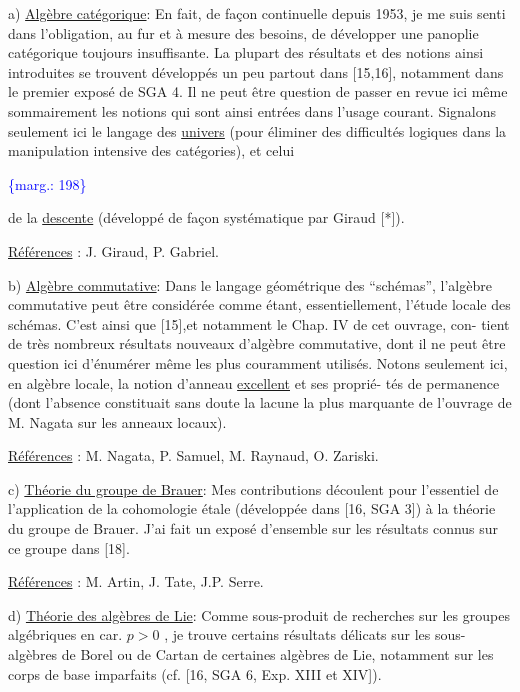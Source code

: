 \documentclass[11pt]{article}
\newcommand{\scanpage}[1]{\par\bigskip\noindent{\small\sffamily[scan #1]}\par}
\newcommand{\mspage}[1]{{\small\sffamily[p.\,#1]}}
\newcommand{\margin}[1]{\textcolor{blue}{\{\textsf{marg.:} #1\}}}
\newcommand{\uline}[1]{\underline{#1}}
\begin{document}
a) \uline{Algèbre catégorique}: En fait, de façon continuelle depuis 1953, je me suis
senti dans l'obligation, au fur et à mesure des besoins, de développer une
panoplie catégorique toujours insuffisante. La plupart des résultats et des
notions ainsi introduites se trouvent développés un peu partout dans [15,16],
notamment dans le premier exposé de SGA 4. Il ne peut être question de passer
en revue ici même sommairement les notions qui sont ainsi entrées dans l'usage
courant. Signalons seulement ici le langage des \uline{univers} (pour éliminer des
difficultés logiques dans la manipulation intensive des catégories), et celui

\margin{198}

\clearpage
\scanpage{119/199}
\mspage{- 4 -}

de la \uline{descente} (développé de façon systématique par Giraud [*]).

\uline{Références} : J. Giraud, P. Gabriel.

b) \uline{Algèbre commutative}: Dans le langage géométrique des ``schémas'', l'algèbre
commutative peut être considérée comme étant, essentiellement, l'étude locale
des schémas. C'est ainsi que [15],et notamment le Chap. IV de cet ouvrage, con-%
tient de très nombreux résultats nouveaux d'algèbre commutative, dont il ne
peut être question ici d'énumérer même les plus couramment utilisés. Notons
seulement ici, en algèbre locale, la notion d'anneau \uline{excellent} et ses proprié-%
tés de permanence (dont l'absence constituait sans doute la lacune la plus
marquante de l'ouvrage de M. Nagata sur les anneaux locaux).

\uline{Références} : M. Nagata, P. Samuel, M. Raynaud, O. Zariski.

c) \uline{Théorie du groupe de Brauer}: Mes contributions découlent pour l'essentiel
de l'application de la cohomologie étale (développée dans [16, SGA 3]) à la
théorie du groupe de Brauer. J'ai fait un exposé d'ensemble sur les résultats
connus sur ce groupe dans [18].

\uline{Références} : M. Artin, J. Tate, J.P. Serre.

d) \uline{Théorie des algèbres de Lie}: Comme sous-produit de recherches sur les
groupes algébriques en car. $p > 0$ , je trouve certains résultats délicats sur
les sous-algèbres de Borel ou de Cartan de certaines algèbres de Lie, notamment
sur les corps de base imparfaits (cf. [16, SGA 6, Exp. XIII et XIV]).
\end{document}
